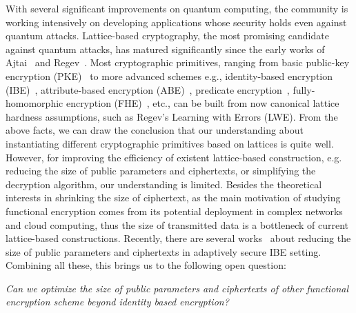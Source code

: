 With several significant improvements on quantum computing, the community is working intensively on developing applications whose security holds even against quantum attacks. Lattice-based cryptography, the most promising candidate against quantum attacks, has matured significantly since the early works of Ajtai~\cite{STOC:Ajtai96} and Regev~\cite{STOC:Regev05}. Most cryptographic primitives, ranging from basic public-key encryption (PKE)~\cite{STOC:Regev05} to more advanced schemes e.g., identity-based encryption (IBE)~\cite{EC:CHKP10,EC:AgrBonBoy10}, attribute-based encryption (ABE)~\cite{STOC:GorVaiWee13,EC:BGGHNS14}, predicate encryption~\cite{AC:AgrFreVai11,C:GorVaiWee15}, fully-homomorphic encryption (FHE)~\cite{STOC:Gentry09,FOCS:BraVai11,C:GenSahWat13}, etc., can be built from now canonical lattice hardness assumptions, such as Regev's Learning with Errors (LWE). From the above facts, we can draw the conclusion that our understanding about instantiating different cryptographic primitives based on lattices is quite well. However, for improving the efficiency of existent lattice-based construction, e.g. reducing the size of public parameters and ciphertexts, or simplifying the decryption algorithm, our understanding is limited. Besides the theoretical interests in shrinking the size of ciphertext, as the main motivation of studying functional encryption comes from its potential deployment in complex networks and cloud computing, thus the size of transmitted data is a bottleneck of current lattice-based constructions. Recently, there are several works~\cite{EC:Yamada16,EPRINT:ApoFanLiu16a,AC:KatYam16} about reducing the size of public parameters and ciphertexts in adaptively secure IBE setting. Combining all these, this brings us to the following open question:
\begin{center}
 \emph{Can we optimize the size of public parameters and ciphertexts of other functional encryption scheme beyond identity based encryption?}
\end{center}

